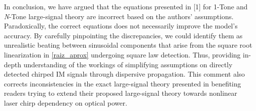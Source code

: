 \documentclass[journal]{IEEEtran}
\begin{document}
In conclusion, we have argued that the equations presented in [1] for 1-Tone and \emph{N}-Tone large-signal theory are incorrect based on the authors' assumptions. Paradoxically, the correct equations does not necessarily improve the model's accuracy. By carefully pinpointing the discrepancies, we could identify them as unrealistic beating between sinusoidal components that arise from the square root linearization in \eqref{raiz_aprox} undergoing square law detection. Thus, providing in-depth understanding of the workings of simplifying assumptions on directly detected chirped IM signals through dispersive propagation. This comment also corrects inconsistencies in the exact large-signal theory presented in \cite{eva} benefiting readers trying to extend their proposed large-signal theory towards nonlinear laser chirp dependency on optical power. 


%
%



%
%
\end{document}

